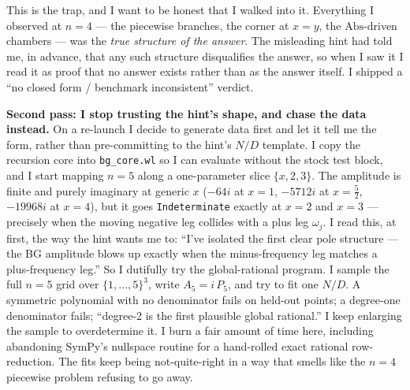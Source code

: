 \documentclass{article}
\begin{document}
This is the trap, and I want to be honest that I walked into it. Everything I
observed at $n=4$ --- the piecewise branches, the corner at $x=y$, the
$\mathrm{Abs}$-driven chambers --- was the \emph{true structure of the answer}.
The misleading hint had told me, in advance, that any such structure disqualifies
the answer, so when I saw it I read it as proof that no answer exists rather than
as the answer itself. I shipped a ``no closed form / benchmark inconsistent''
verdict.

\medskip
\noindent\textbf{Second pass: I stop trusting the hint's shape, and chase the
data instead.}\quad
On a re-launch I decide to generate data first and let it tell me the form,
rather than pre-committing to the hint's $N/D$ template. I copy the recursion
core into \texttt{bg\_core.wl} so I can evaluate without the stock test block, and
I start mapping $n=5$ along a one-parameter slice $\{x,2,3\}$. The amplitude is
finite and purely imaginary at generic $x$ ($-64i$ at $x=1$,
$-5712i$ at $x=\tfrac52$, $-19968i$ at $x=4$), but it goes \texttt{Indeterminate}
exactly at $x=2$ and $x=3$ --- precisely when the moving negative leg collides
with a plus leg $\omega_j$. I read this, at first, the way the hint wants me to:
``I've isolated the first clear pole structure --- the BG amplitude blows up
exactly when the minus-frequency leg matches a plus-frequency leg.'' So I dutifully
try the global-rational program. I sample the full $n=5$ grid over
$\{1,\dots,5\}^3$, write $A_5=i\,P_5$, and try to fit one $N/D$. A symmetric
polynomial with no denominator fails on held-out points; a degree-one denominator
fails; ``degree-2 is the first plausible global rational.'' I keep enlarging the
sample to overdetermine it. I burn a fair amount of time here, including
abandoning SymPy's nullspace routine for a hand-rolled exact rational
row-reduction. The fits keep being not-quite-right in a way that smells like the
$n=4$ piecewise problem refusing to go away.
\end{document}
